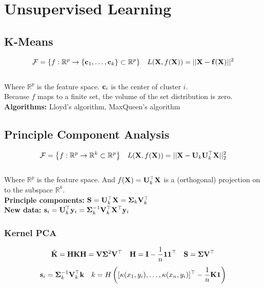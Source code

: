 \section{Unsupervised Learning}
\begin{mdframed}[style=eqbox]
\subsection{K-Means}
\vspace*{-6pt}\begin{align*}
  \mathcal F = \left\{f: \mathbb R^p \to \{\mathbf{c}_1, \ldots, \mathbf{c}_k\} \subset \mathbb R^p \right\} && L(\mathbf{X}, f(\mathbf{X})) = \vert\vert \mathbf{X} - \mathbf{f}(\mathbf{X}) \vert\vert^2
\end{align*}\vspace*{-12pt}\\
\small{Where $\mathbb R^p$ is the feature space. $\mathbf{c}_i$ is the center of cluster $i$.}\\
Because $f$ maps to a finite set, the volume of the set distribution is zero.\\
\textbf{Algorithms:} Lloyd's algorithm, MaxQueen's algorithm
\end{mdframed}
%
\begin{mdframed}[style=eqbox]
\subsection{Principle Component Analysis}
\vspace*{-6pt}\begin{align*}
  \mathcal F = \left\{f: \mathbb R^p \to \mathbb R^k \subset \mathbb R^p \right\} && L(\mathbf{X}, f(\mathbf{X})) = \vert\vert \mathbf{X} - \mathbf{U}_k \mathbf{U}_k^\top\mathbf{X} \vert\vert_2^2
\end{align*}\vspace*{-12pt}\\
\small{Where $\mathbb R^p$ is the feature space. And $f(\mathbf{X}) =\mathbf{U}_k^\top \mathbf{X}$ is a (orthogonal) projection on to the subspace $\mathbb R^k$.}\\
\textbf{Principle components:} $\mathbf{S} = \mathbf{U}_k^\top \mathbf{X} = \mathbf{\Sigma}_k \mathbf{V}_k^\top$\\
\textbf{New data:} $\mathbf{s}_i = \mathbf{U}_k^\top \mathbf{y}_i = \mathbf{\Sigma}_k^{-1} \mathbf{V}_k^\top \mathbf{X}^\top \mathbf{y}_i$
\subsubsection{Kernel PCA}
\vspace*{-10pt}\begin{align*}
  \tilde{\mathbf{K}} = \mathbf{H} \mathbf{K} \mathbf{H} = \mathbf{V} \mathbf{\Sigma}^2 \mathbf{V}^\top && \mathbf{H} = \mathbf{I} - \frac{1}{n} \mathbf{1}\mathbf{1}^\top && \mathbf{S} = \mathbf{\Sigma} \mathbf{V}^\top
\end{align*}
\vspace*{-16pt}\begin{align*}
\mathbf{s}_i = \mathbf{\Sigma}_k^{ - 1} \mathbf{V}_k^\top \mathbf{k}
  &&k = H \left([\kappa(x_1, y_i), \dots, \kappa(x_n, y_i)]^\top - \frac{1}{n}\mathbf{K} \mathbf{1}\right)
\end{align*}
\end{mdframed}